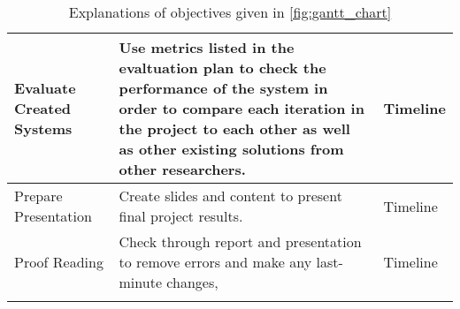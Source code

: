 \begin{longtable}{|| P{0.2\textwidth} | P{.45\textwidth} | P{.15\textwidth} ||}
    \hline
    Evaluate Created Systems                             & Use metrics listed in the evaltuation plan to check the performance of the system in order to compare each iteration in the project to each other as well as other existing solutions from other researchers.                                                                                                                                                                                                                     & Timeline                                  \\
    \hline
    Prepare Presentation                                 & Create slides and content to present final project results.                                                                                                                                                                                                                                                                                                                                                                       & Timeline                                  \\
    \hline
    Proof Reading                                        & Check through report and presentation to remove errors and make any last-minute changes,                                                                                                                                                                                                                                                                                                                                          & Timeline                                  \\
    \hline
    \caption{Explanations of objectives given in \autoref{fig:gantt_chart}}
    \label{tab:objectives_table}
\end{longtable}